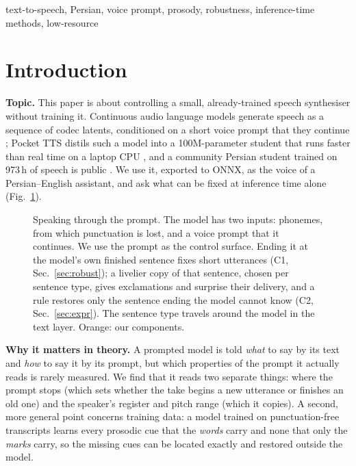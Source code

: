 \documentclass[conference]{IEEEtran}
\begin{document}
\begin{IEEEkeywords}
text-to-speech, Persian, voice prompt, prosody, robustness, inference-time methods, low-resource
\end{IEEEkeywords}

\section{Introduction}\label{sec:intro}
\textbf{Topic.} This paper is about controlling a small, already-trained speech synthesiser without
training it. Continuous audio language models generate speech as a sequence of codec latents, conditioned on
a short voice prompt that they continue \cite{calm2025}; Pocket TTS distils such a model into a 100M-parameter
student that runs faster than real time on a laptop CPU \cite{pockettts2026}, and a community Persian student
trained on 973\,h of speech is public \cite{farsiv2}. We use it, exported to ONNX, as the voice of a
Persian--English assistant, and ask what can be fixed at inference time alone (Fig.~\ref{fig:concept}).

\begin{figure}[t]
\centering

\caption{Speaking through the prompt. The model has two inputs: phonemes, from which punctuation is lost, and
a voice prompt that it continues. We use the prompt as the control surface. Ending it at the model's own
finished sentence fixes short utterances (C1, Sec.~\ref{sec:robust}); a livelier copy of that sentence,
chosen per sentence type, gives exclamations and surprise their delivery, and a rule restores only the
sentence ending the model cannot know (C2, Sec.~\ref{sec:expr}). The sentence type travels around the model
in the text layer. Orange: our components.}
\label{fig:concept}
\end{figure}

\textbf{Why it matters in theory.} A prompted model is told \emph{what} to say by its text and \emph{how} to
say it by its prompt, but which properties of the prompt it actually reads is rarely measured. We find that
it reads two separate things: where the prompt stops (which sets whether the take begins a new utterance or
finishes an old one) and the speaker's register and pitch range (which it copies). A second, more general
point concerns training data: a model trained on punctuation-free transcripts learns every prosodic cue that
the \emph{words} carry and none that only the \emph{marks} carry, so the missing cues can be located exactly
and restored outside the model.
\end{document}
